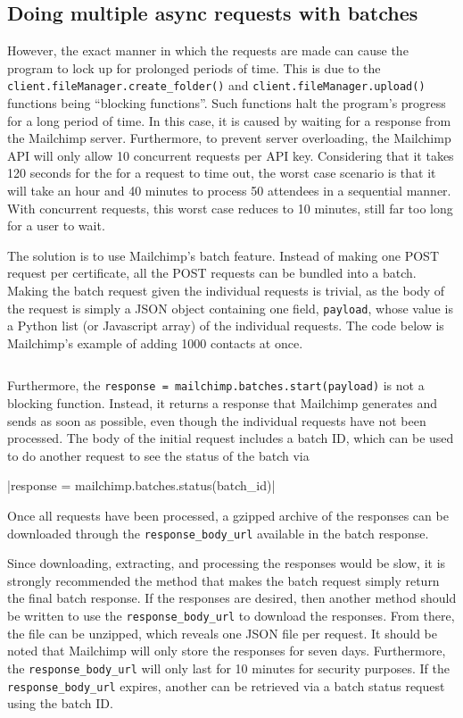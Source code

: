 \documentclass[11pt]{article}
\begin{document}
\subsection{Doing multiple async requests with batches}

However, the exact manner in which the requests are made can cause the program to lock up for prolonged periods of time. This is due to the \texttt{client.fileManager.create_folder()} and \texttt{client.fileManager.upload()} functions being ``blocking functions''. Such functions halt the program's progress for a long period of time. In this case, it is caused by waiting for a response from the Mailchimp server. Furthermore, to prevent server overloading, the Mailchimp API will only allow 10 concurrent requests per API key. Considering that it takes 120 seconds for the for a request to time out, the worst case scenario is that it will take an hour and 40 minutes to process 50 attendees in a sequential manner. With concurrent requests, this worst case reduces to 10 minutes, still far too long for a user to wait.

The solution is to use Mailchimp's batch feature. Instead of making one POST request per certificate, all the POST requests can be bundled into a batch. Making the batch request given the individual requests is trivial, as the body of the request is simply a JSON object containing one field, \texttt{payload}, whose value is a Python list (or Javascript array) of the individual requests. The code below is Mailchimp's example of adding 1000 contacts at once.

\inputminted[linenos=true]{python}{mailchimp_examples/batch_request.py}

Furthermore, the \texttt{response = mailchimp.batches.start(payload)} is not a blocking function. Instead, it returns a response that Mailchimp generates and sends as soon as possible, even though the individual requests have not been processed. The body of the initial request includes a batch ID, which can be used to do another request to see the status of the batch via

|response = mailchimp.batches.status(batch_id)|

\noindent
Once all requests have been processed, a gzipped archive of the responses can be downloaded through the \texttt{response\_body\_url} available in the batch response. 

Since downloading, extracting, and processing the responses would be slow, it is strongly recommended the method that makes the batch request simply return the final batch response. If the responses are desired, then another method should be written to use the \texttt{response\_body\_url} to download the responses. From there, the file can be unzipped, which reveals one JSON file per request. It should be noted that Mailchimp will only store the responses for seven days. Furthermore, the \texttt{response\_body\_url} will only last for 10 minutes for security purposes. If the \texttt{response\_body\_url} expires, another can be retrieved via a batch status request using the batch ID.
\end{document}
